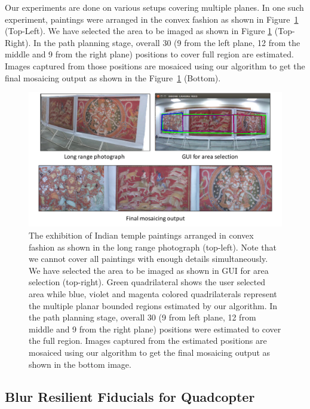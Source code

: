 Our experiments are done on various setups covering multiple planes.
In one such experiment, paintings were arranged in the convex
fashion as shown in Figure~\ref{fig:multiplanar_result} (Top-Left). We have
selected the area to be imaged as shown in Figure \ref{fig:multiplanar_result}
(Top-Right). In the path planning stage, overall 30 (9 from the left plane, 12 from the middle
and 9 from the right plane) positions to cover full region are estimated.  Images
captured from those positions are mosaiced using our algorithm to get the final
mosaicing output as shown in the Figure~\ref{fig:multiplanar_result} (Bottom).
\begin{figure}[h!]
	\centering
	\includegraphics[width=0.98\linewidth]{figures/multiplanar/convexResult}
	\caption[Result: Imaging Convex Surface ]{The exhibition of Indian
	temple paintings arranged in convex fashion as shown in the long range photograph (top-left). Note that we
cannot cover all paintings with enough details simultaneously. We have selected
the area to be imaged as shown in GUI for area selection (top-right).
Green quadrilateral shows the user selected area while blue, violet and magenta
colored quadrilaterals represent the multiple planar bounded regions
estimated by our algorithm. In the path planning stage, overall 30 (9 from left
plane, 12 from middle and 9 from the right plane) positions were estimated to cover
the full region. Images captured from the estimated positions are mosaiced using
our algorithm to get the final mosaicing output as shown in the bottom image.}	
	\label{fig:multiplanar_result}
\end{figure}
	
\subsection{Blur Resilient Fiducials for Quadcopter}

